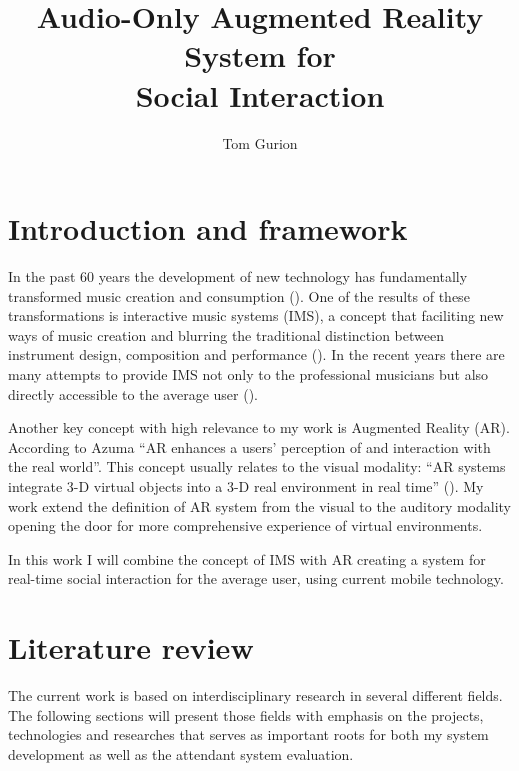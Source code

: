 \documentclass[a4paper,11pt]{article}
\title{Audio-Only Augmented Reality System for\\Social Interaction}
\author{Tom Gurion}
\begin{document}
\maketitle

\listoftodos


\section{Introduction and framework}

In the past 60 years the development of new technology has fundamentally transformed music creation and consumption (\cite{hargreaves99}).
One of the results of these transformations is interactive music systems (IMS), a concept that faciliting new ways of music creation and blurring the traditional distinction between instrument design, composition and performance (\cite{drummond09}).
In the recent years there are many attempts to provide IMS not only to the professional musicians but also directly accessible to the average user (\cite{stimulant13}).


Another key concept with high relevance to my work is Augmented Reality (AR).
According to Azuma ``AR enhances a users' perception of and interaction with the real world''.
This concept usually relates to the visual modality: ``AR systems integrate 3-D virtual objects into a 3-D real environment in real time'' (\cite{azuma97}).
My work extend the definition of AR system from the visual to the auditory modality opening the door for more comprehensive experience of virtual environments.

In this work I will combine the concept of IMS with AR creating a system for real-time social interaction for the average user, using current mobile technology.

\section{Literature review}

The current work is based on interdisciplinary research in several different fields.
The following sections will present those fields with emphasis on the projects, technologies and researches that serves as important roots for both my system development as well as the attendant system evaluation.
\end{document}
